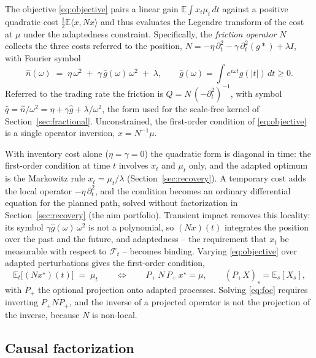 \documentclass[11pt]{article}
\newcommand{\E}{\mathbb{E}}
\newcommand{\F}{\mathcal{F}}
\theoremstyle{plain}
\theoremstyle{definition}
\theoremstyle{remark}
\begin{document}
The objective \eqref{eq:objective} pairs a linear gain $\E\int x_t\mu_t\,dt$ against a positive quadratic cost $\tfrac12\E\langle x,Nx\rangle$ and thus evaluates the Legendre transform of the cost at $\mu$ under the adaptedness constraint. Specifically, the \emph{friction operator} $N$ collects the three costs referred to the position, $N=-\eta\,\partial_t^2-\gamma\,\partial_t^2(g\ast)+\lambda I$, with Fourier symbol
\begin{equation}\label{eq:symbol}
\hat n(\omega) \;=\; \eta\,\omega^2 \;+\; \gamma\,\hat g(\omega)\,\omega^2 \;+\; \lambda,
\qquad \hat g(\omega) = \int e^{i\omega t}g(|t|)\,dt \ge 0.
\end{equation}
Referred to the trading rate the friction is $Q=N\,(-\partial_t^2)^{-1}$, with symbol $\hat q=\hat n/\omega^2=\eta+\gamma\hat g+\lambda/\omega^2$, the form used for the scale-free kernel of Section~\ref{sec:fractional}. Unconstrained, the first-order condition of \eqref{eq:objective} is a single operator inversion, $x=N^{-1}\mu$.

With inventory cost alone ($\eta=\gamma=0$) the quadratic form is diagonal in time: the first-order condition at time $t$ involves $x_t$ and $\mu_t$ only, and the adapted optimum is the Markowitz rule $x_t=\mu_t/\lambda$ (Section~\ref{sec:recovery}). A temporary cost adds the local operator $-\eta\,\partial_t^2$, and the condition becomes an ordinary differential equation for the planned path, solved without factorization in Section~\ref{sec:recovery} (the aim portfolio). Transient impact removes this locality: its symbol $\gamma\hat g(\omega)\,\omega^2$ is not a polynomial, so $(Nx)(t)$ integrates the position over the past and the future, and adaptedness -- the requirement that $x_t$ be measurable with respect to $\F_t$ -- becomes binding. Varying \eqref{eq:objective} over adapted perturbations gives the first-order condition,
\begin{equation}\label{eq:foc}
\E_t\bigl[(Nx^\star)(t)\bigr] \;=\; \mu_t
\qquad\Longleftrightarrow\qquad
P_+\,N\,P_+\,x^\star = \mu,
\qquad (P_+X)_s = \E_s[X_s],
\end{equation}
with $P_+$ the optional projection onto adapted processes. Solving \eqref{eq:foc} requires inverting $P_+NP_+$, and the inverse of a projected operator is not the projection of the inverse, because $N$ is non-local.

\subsection{Causal factorization}\label{sec:thesis}
\end{document}
